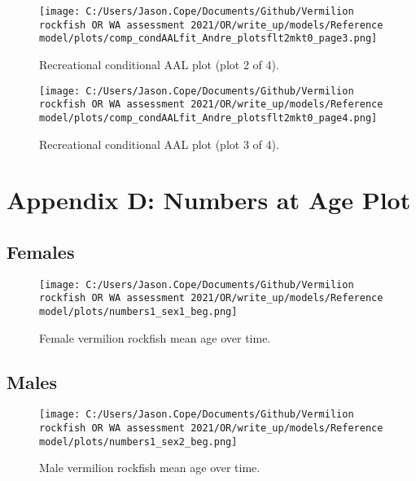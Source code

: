 \documentclass[11pt,
  english,
  letterpaper,
]{article}
\begin{document}
\begin{figure}
\centering
\texttt{[image: C:/Users/Jason.Cope/Documents/Github/Vermilion rockfish OR WA assessment 2021/OR/write\_up/models/Reference model/plots/comp\_condAALfit\_Andre\_plotsflt2mkt0\_page3.png]}
\caption{Recreational conditional AAL plot (plot 2 of 4).\label{fig:comp_condAALfit_Andre_plotsflt2mkt0_page3}}
\end{figure}

\begin{figure}
\centering
\texttt{[image: C:/Users/Jason.Cope/Documents/Github/Vermilion rockfish OR WA assessment 2021/OR/write\_up/models/Reference model/plots/comp\_condAALfit\_Andre\_plotsflt2mkt0\_page4.png]}
\caption{Recreational conditional AAL plot (plot 3 of 4).\label{fig:comp_condAALfit_Andre_plotsflt2mkt0_page4}}
\end{figure}

\clearpage

\hypertarget{app-d}{%
\section{Appendix D: Numbers at Age Plot}\label{app-d}}

\hypertarget{females}{%
\subsection{Females}\label{females}}

\begin{figure}
\centering
\texttt{[image: C:/Users/Jason.Cope/Documents/Github/Vermilion rockfish OR WA assessment 2021/OR/write\_up/models/Reference model/plots/numbers1\_sex1\_beg.png]}
\caption{Female vermilion rockfish mean age over time.\label{fig:num_age_females}}
\end{figure}

\hypertarget{males}{%
\subsection{Males}\label{males}}

\begin{figure}
\centering
\texttt{[image: C:/Users/Jason.Cope/Documents/Github/Vermilion rockfish OR WA assessment 2021/OR/write\_up/models/Reference model/plots/numbers1\_sex2\_beg.png]}
\caption{Male vermilion rockfish mean age over time.\label{fig:num_age_males}}
\end{figure}
\end{document}
